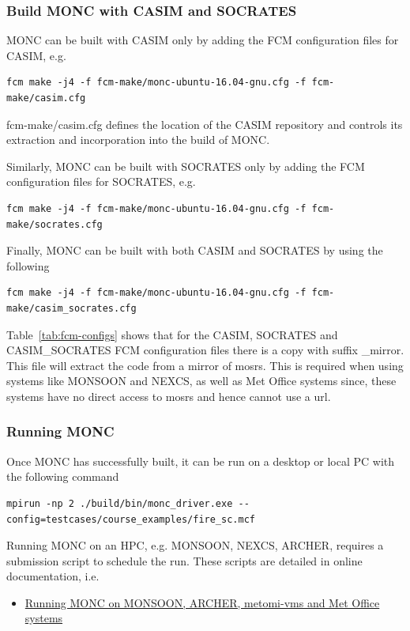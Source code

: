 \documentclass[a4paper,11pt]{article}
\begin{document}
\subsubsection{Build MONC with CASIM and SOCRATES}

MONC can be built with CASIM only by adding the FCM configuration files for
CASIM, e.g.
\begin{lstlisting}
fcm make -j4 -f fcm-make/monc-ubuntu-16.04-gnu.cfg -f fcm-make/casim.cfg
\end{lstlisting}

fcm-make/casim.cfg defines the location of the CASIM repository and controls
its extraction and incorporation into the build of MONC.

Similarly, MONC can be built with SOCRATES only by adding the FCM configuration files for
SOCRATES, e.g.
\begin{lstlisting}
fcm make -j4 -f fcm-make/monc-ubuntu-16.04-gnu.cfg -f fcm-make/socrates.cfg
\end{lstlisting}

Finally, MONC can be built with both CASIM and SOCRATES by using the following
\begin{lstlisting}
fcm make -j4 -f fcm-make/monc-ubuntu-16.04-gnu.cfg -f fcm-make/casim_socrates.cfg
\end{lstlisting}

Table~\ref{tab:fcm-configs} shows that for the CASIM, SOCRATES and
CASIM\_SOCRATES FCM configuration files there is a copy with suffix \_mirror. This
file will extract the code from a mirror of mosrs. This is required when
using systems like MONSOON and NEXCS, as well as Met Office systems since, these
systems have no direct access to mosrs and hence cannot use a url.

\subsubsection{Running MONC}

Once MONC has successfully built, it can be run on a desktop or local PC
with the following command
\begin{lstlisting}
mpirun -np 2 ./build/bin/monc_driver.exe --config=testcases/course_examples/fire_sc.mcf
\end{lstlisting}

Running MONC on an HPC, e.g. MONSOON, NEXCS, ARCHER, requires a submission script
to schedule the run. These scripts are detailed in online documentation, i.e.
\begin{itemize}
  \item {\href{https://code.metoffice.gov.uk/trac/monc/wiki/MoncDoc/MoncUserguide#Set-upandrunMONConMONSOON}
  {Running MONC on MONSOON, ARCHER, metomi-vms and Met Office systems}}
\end{itemize}
\end{document}
